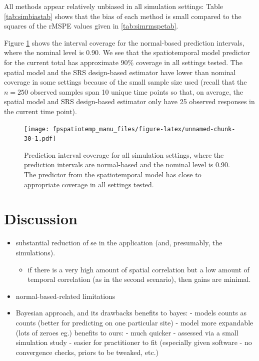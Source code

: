 \documentclass[]{interact}
\theoremstyle{plain}%
\theoremstyle{definition}
\theoremstyle{remark}
\providecommand{\tightlist}{%
  \setlength{\itemsep}{0pt}\setlength{\parskip}{0pt}}
\def\tightlist{}
\begin{document}
All methods appear relatively unbiased in all simulation settings: Table
\ref{tab:simbiastab} shows that the bias of each method is small
compared to the squares of the rMSPE values given in
\ref{tab:simrmspetab}.

Figure \ref{fig:pi} shows the interval coverage for the normal-based
prediction intervals, where the nominal level is 0.90. We see that the
spatiotemporal model predictor for the current total has approximate
90\% coverage in all settings tested. The spatial model and the SRS
design-based estimator have lower than nominal coverage in some settings
because of the small sample size used (recall that the \(n = 250\)
observed samples span 10 unique time points so that, on average, the
spatial model and SRS design-based estimator only have 25 observed
responses in the current time point).

\begin{figure}
\centering
\texttt{[image: fpspatiotemp\_manu\_files/figure-latex/unnamed-chunk-30-1.pdf]}
\caption{\label{fig:pi} Prediction interval coverage for all simulation
settings, where the prediction intervals are normal-based and the
nominal level is 0.90. The predictor from the spatiotemporal model has
close to appropriate coverage in all settings tested.}
\end{figure}

\section{Discussion} \label{section:Discussion}

\begin{itemize}
\item
  substantial reduction of se in the application (and, presumably, the
  simulations).

  \begin{itemize}
  \tightlist
  \item
    if there is a very high amount of spatial correlation but a low
    amount of temporal correlation (as in the second scenario), then
    gains are minimal.
  \end{itemize}
\item
  normal-based-related limitations
\item
  Bayesian approach, and its drawbacks benefits to bayes: - models
  counts as counts (better for predicting on one particular site) -
  model more expandable (lots of zeroes eg.) benefits to ours: - much
  quicker - assessed via a small simulation study - easier for
  practitioner to fit (especially given software - no convergence
  checks, priors to be tweaked, etc.)
\end{itemize}
\end{document}
